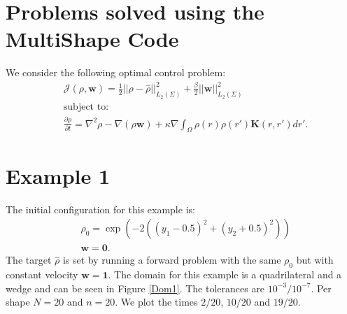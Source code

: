 \documentclass[11pt, a4paper]{article}
\theoremstyle{definition}
\newcommand{\w}{\mathbf{w}}
\newcommand{\K}{\mathbf{K}}
\begin{document}
	\section*{Problems solved using the MultiShape Code}
We consider the following optimal control problem:
\begin{align*}
&\mathcal{J}(\rho, \w) = \frac{1}{2}|| \rho - \widehat \rho||^2_{L_2(\Sigma)} + \frac{\beta}{2}|| \w ||^2_{L_2(\Sigma)}\\
&\text{subject to:}\\
&\frac{\partial \rho}{\partial t} = \nabla^2 \rho - \nabla (\rho \w) + \kappa \nabla \int_\Omega \rho(r) \rho(r') \K(r,r') dr'.
\end{align*}
\section{Example 1}
The initial configuration for this example is:
\begin{align*}
&\rho_0 = \exp(-2((y_1 - 0.5 )^2 + (y_2 + 0.5)^2))\\
&\w = \mathbf 0.
\end{align*}
The target $\widehat \rho$ is set by running a forward problem with the same $\rho_0$ but with constant velocity $\w = \mathbf{1}$.
The domain for this example is a quadrilateral and a wedge and can be seen in Figure \ref{Dom1}. The tolerances are $10^{-3}/ 10^{-7}$. Per shape $N = 20$ and $n = 20$. We plot the times $2/20$, $10/20$ and $19/20$.
\end{document}
